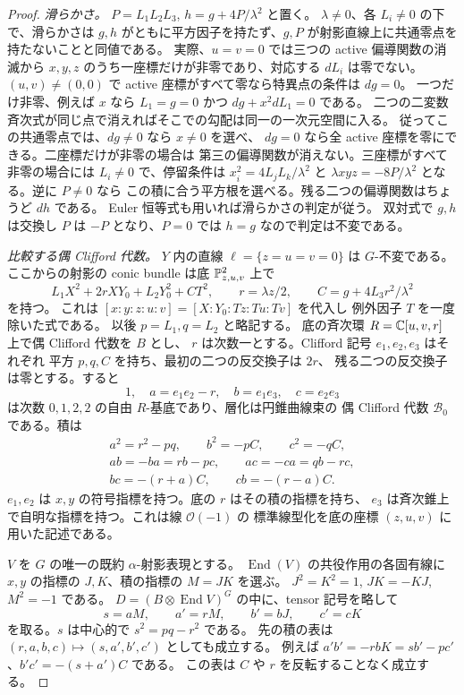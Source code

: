 \begin{proof}
\emph{滑らかさ。}
$P=L_1L_2L_3$, $h=g+4P/\lambda^2$ と置く。
$\lambda\ne0$、各 $L_i\ne0$ の下で、滑らかさは
$g,h$ がともに平方因子を持たず、$g,P$ が射影直線上に共通零点を
持たないことと同値である。
実際、$u=v=0$ では三つの active 偏導関数の消滅から
$x,y,z$ のうち一座標だけが非零であり、対応する $dL_i$ は零でない。
$(u,v)\ne(0,0)$ で active 座標がすべて零なら特異点の条件は $dg=0$。
一つだけ非零、例えば $x$ なら $L_1=g=0$ かつ $dg+x^2dL_1=0$ である。
二つの二変数斉次式が同じ点で消えればそこでの勾配は同一の一次元空間に入る。
従ってこの共通零点では、$dg\ne0$ なら $x\ne0$ を選べ、
$dg=0$ なら全 active 座標を零にできる。二座標だけが非零の場合は
第三の偏導関数が消えない。三座標がすべて非零の場合には
$L_i\ne0$ で、停留条件は $x_i^2=4L_jL_k/\lambda^2$ と
$\lambda xyz=-8P/\lambda^2$ となる。逆に $P\ne0$ なら
この積に合う平方根を選べる。残る二つの偏導関数はちょうど $dh$ である。
Euler 恒等式も用いれば滑らかさの判定が従う。
双対式で $g,h$ は交換し $P$ は $-P$ となり、$P=0$ では $h=g$ なので判定は不変である。

\emph{比較する偶 Clifford 代数。}
$Y$ 内の直線 $\ell=\{z=u=v=0\}$ は $G$-不変である。
ここからの射影の conic bundle は底 $\mathbb P^2_{z,u,v}$ 上で
\[
 L_1 X^2+2r X Y_0+L_2 Y_0^2+C T^2,\qquad
 r=\lambda z/2,\qquad C=g+4L_3r^2/\lambda^2
\]
を持つ。
これは $[x:y:z:u:v]=[X:Y_0:Tz:Tu:Tv]$ を代入し
例外因子 $T$ を一度除いた式である。
以後 $p=L_1,q=L_2$ と略記する。
底の斉次環 $R=\mathbb C[u,v,r]$ 上で偶 Clifford 代数を $B$ とし、
$r$ は次数一とする。Clifford 記号 $e_1,e_2,e_3$ はそれぞれ
平方 $p,q,C$ を持ち、最初の二つの反交換子は $2r$、
残る二つの反交換子は零とする。すると
\[
 1,\quad a=e_1e_2-r,\quad b=e_1e_3,\quad c=e_2e_3
\]
は次数 $0,1,2,2$ の自由 $R$-基底であり、層化は円錐曲線束の
偶 Clifford 代数 $\mathcal B_0$ である。積は
\begin{gather*}
 a^2=r^2-pq,\qquad b^2=-pC,\qquad c^2=-qC,\\
 ab=-ba=rb-pc,\qquad ac=-ca=qb-rc,\\
 bc=-(r+a)C,\qquad cb=-(r-a)C .
\end{gather*}
$e_1,e_2$ は $x,y$ の符号指標を持つ。底の $r$ はその積の指標を持ち、
$e_3$ は斉次錐上で自明な指標を持つ。これは線 $\mathcal O(-1)$ の
標準線型化を底の座標 $(z,u,v)$ に用いた記述である。

$V$ を $G$ の唯一の既約 $\alpha$-射影表現とする。
$\operatorname{End}(V)$ の共役作用の各固有線に
$x,y$ の指標の $J,K$、積の指標の $M=JK$ を選ぶ。
$J^2=K^2=1$, $JK=-KJ$, $M^2=-1$ である。
$D=(B\otimes\operatorname{End}V)^G$ の中に、tensor 記号を略して
\[
 s=aM,\qquad a'=rM,\qquad b'=bJ,\qquad c'=cK
\]
を取る。$s$ は中心的で $s^2=pq-r^2$ である。
先の積の表は $(r,a,b,c)\mapsto(s,a',b',c')$ としても成立する。
例えば $a'b'=-rbK=s b'-p c'$、$b'c'=-(s+a')C$ である。
この表は $C$ や $r$ を反転することなく成立する。


\end{proof}
